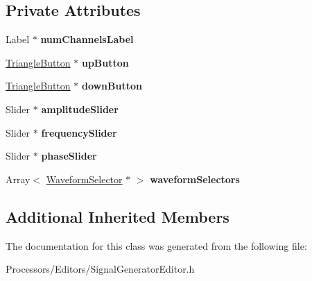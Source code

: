 \subsection*{Private Attributes}
\begin{DoxyCompactItemize}
\item 
\hypertarget{classSignalGeneratorEditor_acda38d4cb291a20bfab5ce2d5013b5ae}{Label $\ast$ {\bfseries num\-Channels\-Label}}\label{classSignalGeneratorEditor_acda38d4cb291a20bfab5ce2d5013b5ae}

\item 
\hypertarget{classSignalGeneratorEditor_a132c2da3204548423cb5dcc5d352a710}{\hyperlink{classTriangleButton}{Triangle\-Button} $\ast$ {\bfseries up\-Button}}\label{classSignalGeneratorEditor_a132c2da3204548423cb5dcc5d352a710}

\item 
\hypertarget{classSignalGeneratorEditor_ae57418a3331d72315e0250e43622c01c}{\hyperlink{classTriangleButton}{Triangle\-Button} $\ast$ {\bfseries down\-Button}}\label{classSignalGeneratorEditor_ae57418a3331d72315e0250e43622c01c}

\item 
\hypertarget{classSignalGeneratorEditor_ac2499b00e668b3aeab63a09eb1a2c89e}{Slider $\ast$ {\bfseries amplitude\-Slider}}\label{classSignalGeneratorEditor_ac2499b00e668b3aeab63a09eb1a2c89e}

\item 
\hypertarget{classSignalGeneratorEditor_a3073b75e76f4cbe8b4dee2caaa4fcd8b}{Slider $\ast$ {\bfseries frequency\-Slider}}\label{classSignalGeneratorEditor_a3073b75e76f4cbe8b4dee2caaa4fcd8b}

\item 
\hypertarget{classSignalGeneratorEditor_a759d6577546094b3a90e0bd5c152affe}{Slider $\ast$ {\bfseries phase\-Slider}}\label{classSignalGeneratorEditor_a759d6577546094b3a90e0bd5c152affe}

\item 
\hypertarget{classSignalGeneratorEditor_aad965f7f052bf9840044edac2699fc3a}{Array$<$ \hyperlink{classWaveformSelector}{Waveform\-Selector} $\ast$ $>$ {\bfseries waveform\-Selectors}}\label{classSignalGeneratorEditor_aad965f7f052bf9840044edac2699fc3a}

\end{DoxyCompactItemize}
\subsection*{Additional Inherited Members}


The documentation for this class was generated from the following file\-:\begin{DoxyCompactItemize}
\item 
Processors/\-Editors/Signal\-Generator\-Editor.\-h\end{DoxyCompactItemize}
